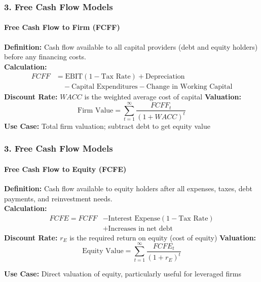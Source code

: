 \documentclass{beamer}
\begin{document}
\begin{frame}[t]
    \frametitle{3. Free Cash Flow Models}
    \framesubtitle{Free Cash Flow to Firm (FCFF)}

    \textbf{Definition:} Cash flow available to all capital providers (debt and equity holders) before any financing costs.\\
    \vspace{1em}
    \textbf{Calculation:}
    \begin{align*}
    FCFF &= \text{EBIT}(1-\text{Tax Rate}) + \text{Depreciation} \\
         &\quad - \text{Capital Expenditures} - \text{Change in Working Capital}
    \end{align*}
    \vspace{1em}
    \textbf{Discount Rate:} $WACC$ is the weighted average cost of capital
    \textbf{Valuation:}
    $$\text{Firm Value} = \sum_{t=1}^{\infty} \frac{FCFF_t}{(1 + WACC)^t}$$
    \vspace{1em}
    \textbf{Use Case:} Total firm valuation; subtract debt to get equity value


\end{frame}

\begin{frame}[t]
    \frametitle{3. Free Cash Flow Models}
    \framesubtitle{Free Cash Flow to Equity (FCFE)}

    \textbf{Definition:} Cash flow available to equity holders after all expenses, taxes, debt payments, and reinvestment needs.\\
    \vspace{1em}
    \textbf{Calculation:}
    \begin{align*}
    FCFE = FCFF &- \text{Interest Expense}(1-\text{Tax Rate}) \\
        &+ \text{Increases in net debt}
    \end{align*}
    \vspace{1em}
    \textbf{Discount Rate:} $r_E$ is the required return on equity (cost of equity) 
    \textbf{Valuation:} 
    $$\text{Equity Value} = \sum_{t=1}^{\infty} \frac{FCFE_t}{(1 + r_E)^t}$$

    \textbf{Use Case:} Direct valuation of equity, particularly useful for leveraged firms

\end{frame}
\end{document}
